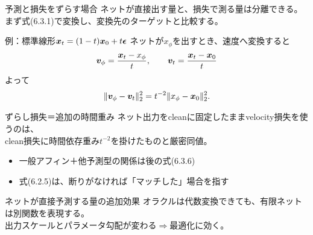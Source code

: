 \asmain
\begin{frame}{予測と損失をずらす場合}
    ネットが直接出す量と、損失で測る量は分離できる。\\
    まず式(6.3.1)で変換し、変換先のターゲットと比較する。
    \begin{block}{例：標準線形$\bm{x}_t=(1-t)\bm{x}_0+t\bm{\epsilon}$}
        ネットが$x_\phi$を出すとき、速度へ変換すると
        \[
            \bm{v}_\phi=\frac{\bm{x}_t-x_\phi}{t},
            \qquad
            \bm{v}_t=\frac{\bm{x}_t-\bm{x}_0}{t}
        \]
        よって
        \[
            \|\bm{v}_\phi-\bm{v}_t\|_{2}^{2}
            =
            t^{-2}\|x_\phi-\bm{x}_0\|_{2}^{2}.
        \]
    \end{block}
\end{frame}
\asmain
\begin{frame}{ずらし損失＝追加の時間重み}
    ネット出力をcleanに固定したままvelocity損失を使うのは、\\
    clean損失に時間依存重み$t^{-2}$を掛けたものと厳密同値。
    \begin{itemize}
        \item 一般アフィン＋他予測型の関係は後の式(6.3.6)
        \item 式(6.2.5)は、断りがなければ「マッチした」場合を指す
    \end{itemize}
    \begin{alertblock}{ネットが直接予測する量の追加効果}
        オラクルは代数変換できても、有限ネットは別関数を表現する。\\
        出力スケールとパラメータ勾配が変わる$\Rightarrow$最適化に効く。
    \end{alertblock}
\end{frame}
